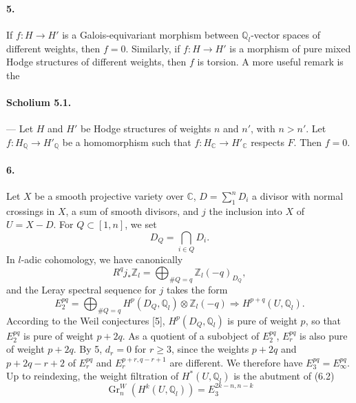 \documentclass[10pt]{article}
\newcommand{\C}{\mathbb C}
\newcommand{\Q}{\mathbb Q}
\newcommand{\Z}{\mathbb Z}
\newcommand{\Gr}{\operatorname{Gr}}
\begin{document}
\paragraph{5.} If $f:H\to H'$ is a Galois-equivariant morphism between $\Q_l$-vector spaces of different weights, then $f=0$. Similarly, if $f:H\to H'$ is a morphism of pure mixed Hodge structures of different weights, then $f$ is torsion. A more useful remark is the %

\paragraph{Scholium 5.1.} — Let $H$ and $H'$ be Hodge structures of weights $n$ and $n'$, with $n>n'$. Let $f:H_\Q\to H'_\Q$ be a homomorphism such that $f:H_\C\to H'_\C$ respects $F$. Then $f=0$.

\paragraph{6.} Let $X$ be a smooth projective variety over $\C$, $D=\sum_1^n D_i$ a divisor with normal crossings in $X$, a sum of smooth divisors, and $j$ the inclusion into $X$ of $U=X-D$. For $Q\subset[1,n]$, we set
\[
D_Q=\bigcap_{i\in Q}D_i.
\]
In $l$-adic cohomology, we have canonically
\[
\tag{6.1}
R^qj_*\Z_l=\bigoplus_{\#Q=q}\Z_l(-q)_{D_Q},
\]
and the Leray spectral sequence for $j$ takes the form
\[
\tag{6.2}
E_2^{pq}=\bigoplus_{\#Q=q}H^p(D_Q,\Q_l)\otimes\Z_l(-q)\Rightarrow H^{p+q}(U,\Q_l).
\]
According to the Weil conjectures [5], $H^p(D_Q,\Q_l)$ is pure of weight $p$, so that $E_2^{pq}$ is pure of weight $p+2q$. As a quotient of a subobject of $E_2^{pq}$, $E_r^{pq}$ is also pure of weight $p+2q$. By 5, $d_r=0$ for $r\ge3$, since the weights $p+2q$ and $p+2q-r+2$ of $E_r^{pq}$ and $E_r^{p+r,q-r+1}$ are different. We therefore have $E_3^{pq}=E_\infty^{pq}$. Up to reindexing, the weight filtration of $H^*(U,\Q_l)$ is the abutment of (6.2)
\[
\tag{6.3}
\Gr_n^W(H^k(U,\Q_l))=E_3^{2k-n,n-k}
\]
\end{document}
